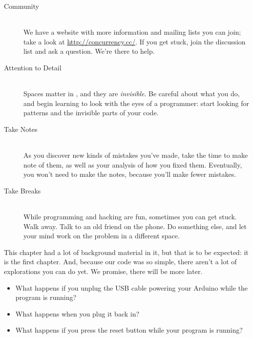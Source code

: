 \begin{description}
	\item[Community]\ \\ We have a website with more information and mailing lists you can join; take a look at \url{http://concurrency.cc/}. If you get stuck, join the discussion list and ask a question. We're there to help.
	\item[Attention to Detail]\ \\ Spaces matter in \plumbing, and they are {\em invisible}. Be careful about what you do, and begin learning to look with the eyes of a programmer: start looking for patterns and the invisible parts of your code.
	\item[Take Notes]\ \\ As you discover new kinds of mistakes you've made, take the time to make note of them, as well as your analysis of how you fixed them. Eventually, you won't need to make the notes, because you'll make fewer mistakes.
	\item[Take Breaks]\ \\ While programming and hacking are fun, sometimes you can get stuck. Walk away. Talk to an old friend on the phone. Do something else, and let your mind work on the problem in a different space.
\end{description}

\EXPLORATIONS
This chapter had a lot of background material in it, but that is to be expected: it is the first chapter. And, because our code was so simple, there aren't a lot of explorations you can do yet. We promise, there will be more later.

\begin{itemize}
	\item What happens if you unplug the USB cable powering your Arduino while the program is running? 
	\item What happens when you plug it back in?
	\item What happens if you press the reset button while your program is running?
\end{itemize}